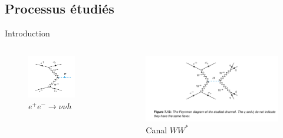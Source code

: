 \documentclass[9pt]{beamer}
\begin{document}
\subsection{Processus étudiés}
\begin{frame}{Introduction}

	\begin{columns}
	
		\begin{column}{0.3\textwidth}
			\begin{figure}
				\centering
				\includegraphics[width=0.8\textwidth]{../img/FeynmanHiggs_nnh.png} 
				\caption{$ e^{+} e^{-} \longrightarrow \nu \nu h $}
			\end{figure}
		\end{column}
		
		\begin{column}{0.3\textwidth}
			\begin{figure}
				\centering
				\includegraphics[width=\textwidth]{../img/nnh_WW.png} 
				\caption{Canal $WW^{*}$}
			\end{figure}
		\end{column}
		

\end{columns}
\end{frame}
\end{document}
